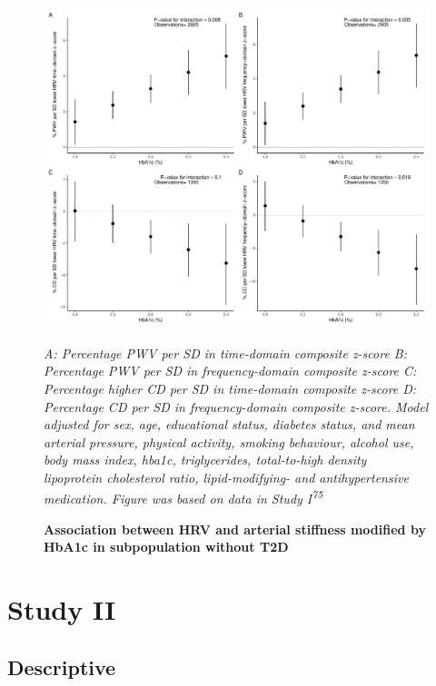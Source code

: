 \documentclass[
  letterpaper,
  headsepline=true,
  open=any]{scrbook}
\begin{document}
\begin{figure}

{\centering 

\includegraphics{images/em_hba1c.pdf}

\emph{A: Percentage PWV per SD in time-domain composite z-score B:
Percentage PWV per SD in frequency-domain composite z-score C:
Percentage higher CD per SD in time-domain composite z-score D:
Percentage CD per SD in frequency-domain composite z-score. Model
adjusted for sex, age, educational status, diabetes status, and mean
arterial pressure, physical activity, smoking behaviour, alcohol use,
body mass index, hba1c, triglycerides, total-to-high density lipoprotein
cholesterol ratio, lipid-modifying- and antihypertensive medication.
Figure was based on data in Study I\textsuperscript{75}}

}

\caption{\label{fig-MS-HRV}\textbf{Association between HRV and arterial
stiffness modified by HbA1c in subpopulation without T2D}}

\end{figure}

\restoregeometry

\hypertarget{study-ii}{%
\section{Study II}\label{study-ii}}

\hypertarget{descriptive-1}{%
\subsection{Descriptive}\label{descriptive-1}}
\end{document}
